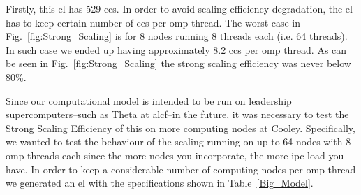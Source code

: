 \documentclass[10pt,journal,compsoc]{IEEEtran}
\begin{document}
Firstly, this \gls{el} has 529 \glspl{cc}. In order to avoid scaling efficiency degradation, the \gls{el} has to keep certain number of \glspl{cc} per \gls{omp} thread. The worst case in Fig.~\ref{fig:Strong_Scaling} is for 8 nodes running 8 threads each (i.e. 64 threads). In such case we ended up having approximately 8.2 \glspl{cc} per \gls{omp} thread. As can be seen in Fig.~\ref{fig:Strong_Scaling} the strong scaling efficiency was never below 80\%. 

Since our computational model is intended to be run on leadership supercomputers--such as Theta at \gls{alcf}--in the future, it was necessary to test the Strong Scaling Efficiency of this on more computing nodes at Cooley. Specifically, we wanted to test the behaviour of the scaling running on up to 64 nodes with 8 \gls{omp} threads each since the more nodes you incorporate, the more \gls{ipc} load you have. In order to keep a considerable number of computing nodes per \gls{omp} thread we generated an \gls{el} with the specifications shown in Table~\ref{Big_Model}. 
\end{document}
